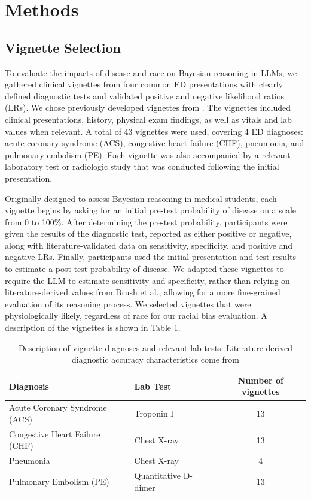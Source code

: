 \section{Methods}

\subsection{Vignette Selection}

To evaluate the impacts of disease and race on Bayesian reasoning in LLMs, we gathered clinical vignettes from four common ED presentations with clearly defined diagnostic tests and validated positive and negative likelihood ratios (LRs). We chose previously developed vignettes from \citet{brushEffectTeachingBayesian2019}. The vignettes included clinical presentations, history, physical exam findings, as well as vitals and lab values when relevant. A total of 43 vignettes were used, covering 4 ED diagnoses: acute coronary syndrome (ACS), congestive heart failure (CHF), pneumonia, and pulmonary embolism (PE). Each vignette was also accompanied by a relevant laboratory test or radiologic study that was conducted following the initial presentation. 

Originally designed to assess Bayesian reasoning in medical students, each vignette begins by asking for an initial pre-test probability of disease on a scale from 0 to 100\%. After determining the pre-test probability, participants were given the results of the diagnostic test, reported as either positive or negative, along with literature-validated data on sensitivity, specificity, and positive and negative LRs. Finally, participants used the initial presentation and test results to estimate a post-test probability of disease. We adapted these vignettes to require the LLM to estimate sensitivity and specificity, rather than relying on literature-derived values from Brush et al., allowing for a more fine-grained evaluation of its reasoning process. We selected vignettes that were physiologically likely, regardless of race for our racial bias evaluation. A description of the vignettes is shown in Table 1.

\begin{table}
\caption{Description of vignette diagnoses and relevant lab tests. Literature-derived diagnostic accuracy characteristics come from \citet{brushEffectTeachingBayesian2019}}
\label{tab:aim2-vignettes}
\begin{tabular}{llc} \toprule
Diagnosis & Lab Test & Number of vignettes \\ \midrule
Acute Coronary Syndrome (ACS) & Troponin I & 13 \\
Congestive Heart Failure (CHF) & Chest X-ray & 13 \\
Pneumonia & Chest X-ray & 4 \\
Pulmonary Embolism (PE) & Quantitative D-dimer & 13 \\ \bottomrule
\end{tabular}%
\end{table}

